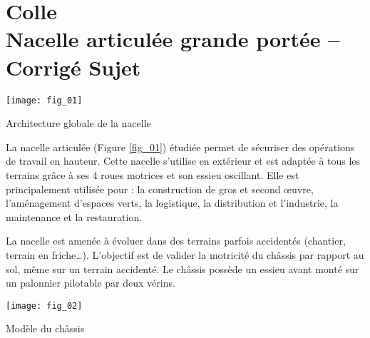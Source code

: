 \chapter*{Colle  \\ 
Nacelle articulée grande portée -- 
\ifprof Corrigé \else Sujet \fi}

\iflivret {} \else
\ifprof  {} \else \fi
\fi

\setcounter{question}{0}






\ifprof
\else
\begin{marginfigure}
\centering
\texttt{[image: fig\_01]}
\caption{Architecture globale de la nacelle \label{fig_01}}
\end{marginfigure}

La nacelle articulée (Figure \ref{fig_01}) étudiée permet de sécuriser des opérations de travail en hauteur. 
Cette nacelle s’utilise en extérieur et est adaptée à tous les terrains grâce à ses 4 roues motrices 
et son essieu oscillant. Elle est principalement utilisée pour : la construction de gros et second 
œuvre, l’aménagement d’espaces verts, la logistique, la distribution et l’industrie, la maintenance 
et la restauration. 


La nacelle est amenée à évoluer dans des terrains parfois accidentés (chantier, terrain en friche…).
L’objectif est de valider la motricité du châssis par rapport au sol, même sur un terrain accidenté. 
Le châssis possède un essieu avant monté sur un palonnier pilotable par deux vérins. 

\begin{marginfigure}
\centering
\texttt{[image: fig\_02]}
\caption{Modèle du châssis \label{fig_02}}
\end{marginfigure}


